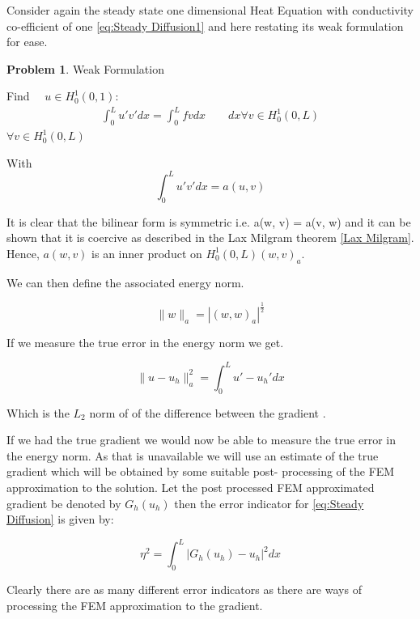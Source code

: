 \documentclass{uonmathreport}
\theoremstyle{definition}
\theoremstyle{problem}
\newtheorem{problem}{Problem}[section]
\theoremstyle{theorem}
\begin{document}
Consider again the steady state one dimensional Heat Equation with conductivity co-efficient of one \ref{eq:Steady Diffusion1} and here restating its weak formulation for ease.

\begin{problem}{Weak Formulation}

Find $\quad u \in H^1_0(0, 1)$:
\begin{align*}
\int_0^L  u' v'  dx =   \int_0^L  f v dx  \quad \quad  dx \forall v \in H^1_0(0, L)
\end{align*}
$\forall v \in H^1_0(0, L)$
\end{problem}

With
\begin{equation*}
\int_0^L  u' v'  dx = a(u, v)  	
\end{equation*}

It is clear that the bilinear form is symmetric i.e.  a(w, v) = a(v, w) and it can be shown that it is coercive as described in the Lax Milgram theorem \ref{Lax Milgram}. Hence, $a(w, v)$ is an inner product on $H^1_0(0, L) (w, v)_a$.

We can then define the associated energy norm.

\begin{equation}
\|w\|_a = |(w, w)_a|^\frac{1}{2}
\end{equation}

If we measure the true error in the energy norm we get.

\begin{equation}
\|u-u_h\|_a^2 = \int_0^L  u' - u_h'  dx
\end{equation}

Which is the $L_2$ norm of of the difference between the gradient .

If we had the true gradient we would now be able to measure the true error in the energy norm. As that is unavailable we will use an estimate of the true gradient which will be obtained by some suitable post- processing of the FEM approximation to the solution. Let the post processed FEM approximated gradient be denoted by $G_h(u_h)$ then the error indicator for \ref{eq:Steady Diffusion} is given by:

\begin{equation}
\eta^2 = \int_0^L  |G_h(u_h) - u_h|^2  dx
\end{equation}

Clearly there are as many different error indicators as there are ways of processing the FEM approximation to the gradient.
\end{document}
